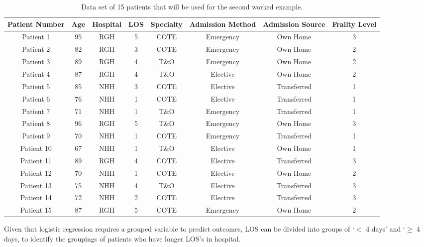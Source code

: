 \documentclass[../thesis.tex]{subfiles}
\begin{document}
\begin{table}[h!]
    \centering
    \begin{adjustbox}{width=\columnwidth}
    \begin{tabular}{cccccccc}\toprule
       \textbf{Patient Number}  & \textbf{Age} & \textbf{Hospital} & \textbf{LOS} & \textbf{Specialty} &\textbf{Admission Method} & \textbf{Admission Source} & \textbf{Frailty Level} \\\midrule
        Patient 1 & 95 & RGH & 5 & COTE & Emergency & Own Home & 3 \\ 
        Patient 2 & 82 & RGH & 3 & COTE & Emergency & Own Home & 2 \\
        Patient 3 & 89 & RGH & 4& T\&O & Emergency & Own Home & 2 \\
        Patient 4 & 87 & RGH & 4 & T\&O & Elective & Own Home & 2 \\
        Patient 5 & 85 & NHH & 3 & COTE & Elective & Transferred & 1 \\
        Patient 6 & 76 & NHH & 1 & COTE & Elective & Transferred & 1\\
        Patient 7 & 71 & NHH & 1 & T\&O & Emergency & Transferred & 1 \\
        Patient 8 & 96 & RGH & 5 & T\&O & Emergency & Own Home & 3 \\
        Patient 9 & 70 & NHH & 1 & COTE & Emergency & Transferred & 1\\
        Patient 10 & 67 & NHH & 1 & T\&O & Elective & Own Home & 1\\
        Patient 11 & 89 & RGH & 4 & COTE & Elective & Transferred & 3\\
        Patient 12 & 70 & NHH & 1 & COTE & Elective & Own Home & 2\\
        Patient 13 & 75 & NHH & 4 & T\&O & Elective & Transferred & 3\\
        Patient 14 & 72 & NHH & 2 & COTE & Elective & Transferred & 3\\
        Patient 15 & 87 & RGH & 5 & COTE & Emergency & Own Home & 2\\\bottomrule
    \end{tabular}
    \end{adjustbox}
    \caption{Data set of 15 patients that will be used for the second worked example.}
    \label{tab:WETableExtended}
\end{table}

Given that logistic regression requires a grouped variable to predict outcomes, LOS can be divided into groups of `$<$ 4 days' and `$\geq$ 4 days, to identify the groupings of patients who have longer LOS's in hospital.
\end{document}
